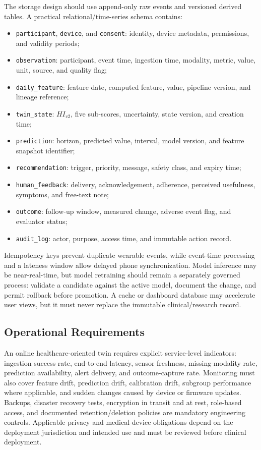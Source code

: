 \documentclass[11pt,a4paper]{article}
\begin{document}
The storage design should use append-only raw events and versioned derived tables. A practical relational/time-series schema contains:
\begin{itemize}
    \item \texttt{participant}, \texttt{device}, and \texttt{consent}: identity, device metadata, permissions, and validity periods;
    \item \texttt{observation}: participant, event time, ingestion time, modality, metric, value, unit, source, and quality flag;
    \item \texttt{daily\_feature}: feature date, computed feature, value, pipeline version, and lineage reference;
    \item \texttt{twin\_state}: $HI_{v2}$, five sub-scores, uncertainty, state version, and creation time;
    \item \texttt{prediction}: horizon, predicted value, interval, model version, and feature snapshot identifier;
    \item \texttt{recommendation}: trigger, priority, message, safety class, and expiry time;
    \item \texttt{human\_feedback}: delivery, acknowledgement, adherence, perceived usefulness, symptoms, and free-text note;
    \item \texttt{outcome}: follow-up window, measured change, adverse event flag, and evaluator status;
    \item \texttt{audit\_log}: actor, purpose, access time, and immutable action record.
\end{itemize}

Idempotency keys prevent duplicate wearable events, while event-time processing and a lateness window allow delayed phone synchronization. Model inference may be near-real-time, but model retraining should remain a separately governed process: validate a candidate against the active model, document the change, and permit rollback before promotion. A cache or dashboard database may accelerate user views, but it must never replace the immutable clinical/research record.

\subsection{Operational Requirements}
An online healthcare-oriented twin requires explicit service-level indicators: ingestion success rate, end-to-end latency, sensor freshness, missing-modality rate, prediction availability, alert delivery, and outcome-capture rate. Monitoring must also cover feature drift, prediction drift, calibration drift, subgroup performance where applicable, and sudden changes caused by device or firmware updates. Backups, disaster recovery tests, encryption in transit and at rest, role-based access, and documented retention/deletion policies are mandatory engineering controls. Applicable privacy and medical-device obligations depend on the deployment jurisdiction and intended use and must be reviewed before clinical deployment.
\end{document}
